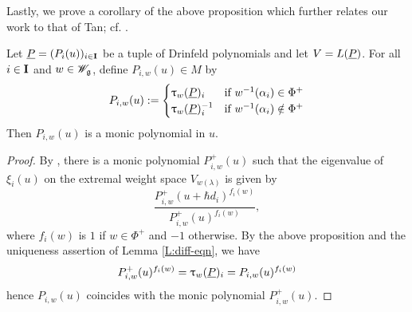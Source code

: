 Lastly, we prove a corollary of the above proposition which further relates our work to that of Tan; cf. \cite[Prop. 4.5]{tan_braid_2015}.

\begin{corollary}\label{C:Tan-monic}
    Let $\underline{P} = (P_i(u))_{i\in\mathbf{I}}$ be a tuple of Drinfeld polynomials and let $V = L(\underline{P})$.
    For all $i\in\mathbf{I}$ and $w\in\mathscr{W}_{\mathfrak{g}}$, define $P_{i,w}(u)\in M$ by
    \[P_{i,w}(u) :=
    \begin{cases}
        \uptau_w(\underline{P})_i & \text{if } w^{-1}(\alpha_i)\in\Phi^+ \\
        \uptau_w(\underline{P})_i^{-1} & \text{if } w^{-1}(\alpha_i)\notin\Phi^+
    \end{cases}\]
    Then $P_{i,w}(u)$ is a monic polynomial in $u$.
\end{corollary}
\begin{proof}
    By \cite[Remark 2.2]{chari_fundamental_1991}, there is a monic polynomial $P^+_{i,w}(u)$ such that the eigenvalue of $\xi_i(u)$ on the extremal weight space $V_{w(\lambda)}$ is given by
    \[\frac{P^+_{i,w}(u+\hbar d_i)^{f_i(w)}}{P^+_{i,w}(u)^{f_i(w)}},\]
    where $f_i(w)$ is $1$ if $w\in\Phi^+$ and $-1$ otherwise.
    By the above proposition and the uniqueness assertion of Lemma \ref{L:diff-eqn}, we have
    \[P^+_{i,w}(u)^{f_i(w)} = \uptau_w(\underline{P})_i = P_{i,w}(u)^{f_i(w)}\]
    hence $P_{i,w}(u)$ coincides with the monic polynomial $P^+_{i,w}(u)$.
\end{proof}